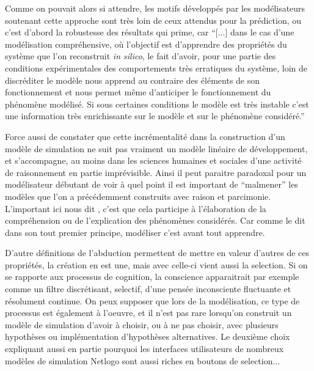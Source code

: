 Comme on pouvait alors si attendre, les motifs développés par les modélisateurs soutenant cette approche sont très loin de ceux attendus pour la prédiction, ou c'est d'abord la robustesse des résultats qui prime, car \enquote{[...] dans le cas d’une modélisation compréhensive, où l’objectif est d’apprendre des propriétés du système que l’on reconstruit \textit{in silico}, le fait d’avoir, pour une partie des conditions expérimentales des comportements très erratiques du système, loin de discréditer le modèle nous apprend au contraire des éléments de son fonctionnement et nous permet même d’anticiper le fonctionnement du phénomène modélisé. Si sous certaines conditions le modèle est très instable c’est une information très enrichissante sur le modèle et sur le phénomène considéré.} \autocite{Amblard2010} 

Force aussi de constater que cette incrémentalité dans la construction d'un modèle de simulation ne suit pas vraiment un modèle linéaire de développement, et s'accompagne, au moins dans les sciences humaines et sociales d'une activité de raisonnement en partie imprévisible. Ainsi il peut paraitre paradoxal pour un modélisateur débutant de voir à quel point il est important de \enquote{malmener} les modèles que l'on a précédemment construits avec raison et parcimonie. L'important ici nous dit \textcite{Amblard2010}, c'est que cela participe à l'élaboration de la compréhension ou de l'explication des phénomènes considérés. Car comme le dit \textcite[65]{Banos2013} dans son tout premier principe, modéliser c'est avant tout apprendre.

D'autre définitions de l'abduction  permettent de mettre en valeur d'autres de ces propriétés, la création en est une, mais avec celle-ci vient aussi la selection. Si on se rapporte aux processus de cognition, la conscience apparaitrait par exemple comme un filtre discrétisant, selectif, d'une pensée inconsciente fluctuante et résolument continue. On peux supposer que lors de la modélisation, ce type de processus est également à l'oeuvre, et il n'est pas rare lorsqu'on construit un modèle de simulation d'avoir à choisir, ou à ne pas choisir, avec plusieurs hypothèses ou implémentation d'hypothèses alternatives. Le deuxième choix expliquant aussi en partie pourquoi les interfaces utilisateurs de nombreux modèles de simulation Netlogo sont aussi riches en boutons de selection...



